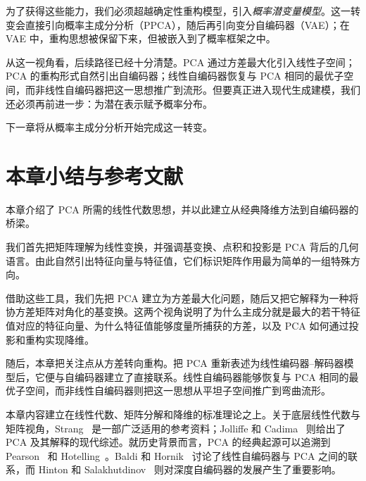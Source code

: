 为了获得这些能力，我们必须超越确定性重构模型，引入\emph{概率潜变量模型}。这一转变会直接引向概率主成分分析（PPCA），随后再引向变分自编码器（VAE）；在 VAE 中，重构思想被保留下来，但被嵌入到了概率框架之中。

从这一视角看，后续路径已经十分清楚。PCA 通过方差最大化引入线性子空间；PCA 的重构形式自然引出自编码器；线性自编码器恢复与 PCA 相同的最优子空间，而非线性自编码器把这一思想推广到流形。但要真正进入现代生成建模，我们还必须再前进一步：为潜在表示赋予概率分布。

下一章将从概率主成分分析开始完成这一转变。

\section*{本章小结与参考文献}

本章介绍了 PCA 所需的线性代数思想，并以此建立从经典降维方法到自编码器的桥梁。

我们首先把矩阵理解为线性变换，并强调基变换、点积和投影是 PCA 背后的几何语言。由此自然引出特征向量与特征值，它们标识矩阵作用最为简单的一组特殊方向。

借助这些工具，我们先把 PCA 建立为方差最大化问题，随后又把它解释为一种将协方差矩阵对角化的基变换。这两个视角说明了为什么主成分就是最大的若干特征值对应的特征向量、为什么特征值能够度量所捕获的方差，以及 PCA 如何通过投影和重构实现降维。

随后，本章把关注点从方差转向重构。把 PCA 重新表述为线性编码器--解码器模型后，它便与自编码器建立了直接联系。线性自编码器能够恢复与 PCA 相同的最优子空间，而非线性自编码器则把这一思想从平坦子空间推广到弯曲流形。

\bigskip

本章内容建立在线性代数、矩阵分解和降维的标准理论之上。关于底层线性代数与矩阵视角，Strang~\cite{strang2016introduction} 是一部广泛适用的参考资料；Jolliffe 和 Cadima~\cite{jolliffe2016pca} 则给出了 PCA 及其解释的现代综述。就历史背景而言，PCA 的经典起源可以追溯到 Pearson~\cite{pearson1901} 和 Hotelling~\cite{hotelling1933}。Baldi 和 Hornik~\cite{baldi1989neural} 讨论了线性自编码器与 PCA 之间的联系，而 Hinton 和 Salakhutdinov~\cite{hinton2006reducing} 则对深度自编码器的发展产生了重要影响。
